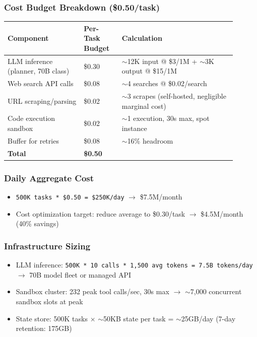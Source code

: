 \subsubsection*{Cost Budget Breakdown (\$0.50/task)}

\begin{tabular}{|p{0.30\linewidth}|p{0.15\linewidth}|p{0.45\linewidth}|}
\hline
\textbf{Component} & \textbf{Per-Task Budget} & \textbf{Calculation} \\
\hline
LLM inference (planner, 70B class) & \$0.30 & $\sim$12K input @ \$3/1M + $\sim$3K output @ \$15/1M \\
\hline
Web search API calls & \$0.08 & $\sim$4 searches @ \$0.02/search \\
\hline
URL scraping/parsing & \$0.02 & $\sim$3 scrapes (self-hosted, negligible marginal cost) \\
\hline
Code execution sandbox & \$0.02 & $\sim$1 execution, 30s max, spot instance \\
\hline
Buffer for retries & \$0.08 & $\sim$16\% headroom \\
\hline
\textbf{Total} & \textbf{\$0.50} & \\
\hline
\end{tabular}

\subsubsection*{Daily Aggregate Cost}

\begin{itemize}
  \item \texttt{500K tasks * \$0.50 = \$250K/day} $\rightarrow$ \$7.5M/month
  \item Cost optimization target: reduce average to \$0.30/task $\rightarrow$ \$4.5M/month (40\% savings)
\end{itemize}

\subsubsection*{Infrastructure Sizing}

\begin{itemize}
  \item LLM inference: \texttt{500K * 10 calls * 1,500 avg tokens = 7.5B tokens/day} $\rightarrow$ 70B model fleet or managed API
  \item Sandbox cluster: 232 peak tool calls/sec, 30s max $\rightarrow$ $\sim$7,000 concurrent sandbox slots at peak
  \item State store: 500K tasks $\times$ $\sim$50KB state per task = $\sim$25GB/day (7-day retention: 175GB)
\end{itemize}

